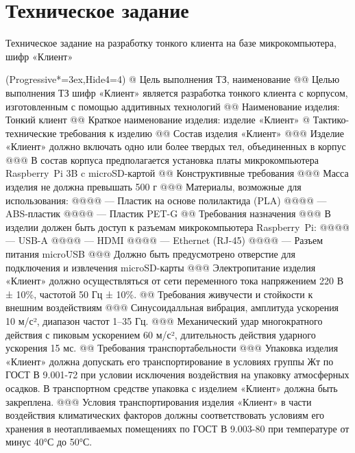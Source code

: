 \section{Техническое задание}

Техническое задание на разработку тонкого клиента на базе микрокомпьютера, шифр «Клиент»

\begin{easylist}[articletoc]
\ListProperties(Progressive*=3ex,Hide4=4)
@ Цель выполнения ТЗ, наименование
@@ Целью выполнения ТЗ шифр «Клиент» является разработка тонкого клиента с корпусом,
изготовленным с помощью аддитивных технологий
@@ Наименование изделия: Тонкий клиент
@@ Краткое наименование изделия: изделие «Клиент»
@ Тактико-технические требования к изделию
@@ Состав изделия «Клиент»
@@@ Изделие «Клиент» должно включать одно или более твердых тел, объединенных в корпус
@@@ В состав корпуса предполагается установка платы микрокомпьютера Raspberry~Pi 3B c
microSD-картой
@@ Конструктивные требования
@@@ Масса изделия не должна превышать 500 г
@@@ Материалы, возможные для использования: 
@@@@ — Пластик на основе полилактида (PLA)
@@@@ — ABS-пластик
@@@@ — Пластик PET-G
@@ Требования назначения
@@@ В изделии должен быть доступ к разъемам микрокомпьютера Raspberry~Pi:
@@@@ — USB-A
@@@@ — HDMI
@@@@ — Ethernet (RJ-45)
@@@@ — Разъем питания microUSB
@@@ Должно быть предусмотрено отверстие для подключения и извлечения microSD-карты
@@@ Электропитание изделия «Клиент» должно осуществляться от сети
переменного тока напряжением 220 В ± 10\%, частотой 50 Гц ± 10\%.
@@ Требования живучести и стойкости к внешним воздействиям
@@@ Синусоидалльная вибрация, амплитуда ускорения 10 м/с², диапазон частот 1–35 Гц.
@@@ Механический удар многократного действия с пиковым ускорением 60 м/с², длительность
действия ударного ускорения 15 мс.
@@ Требования транспортабельности
@@@ Упаковка изделия «Клиент» должна допускать его транспортирование
в условиях группы Жт по ГОСТ В 9.001-72 при условии исключения воздействия
на упаковку атмосферных осадков. В транспортном средстве упаковка с
изделием «Клиент» должна быть закреплена.
@@@ Условия транспортирования изделия «Клиент» в части воздействия
климатических факторов должны соответствовать условиям его хранения в
неотапливаемых помещениях по ГОСТ В 9.003-80 при температуре от минус
40°С до 50°С.
\end{easylist}

